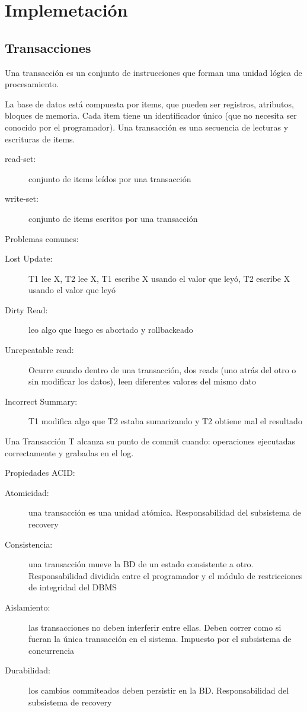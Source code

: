 \chapter{Implemetación}

\section{Transacciones}

Una transacción es un conjunto de instrucciones que forman una unidad lógica de procesamiento.

La base de datos está compuesta por items, que pueden ser registros, atributos, bloques de memoria.
Cada item tiene un identificador único (que no necesita ser conocido por el programador).
Una transacción es una secuencia de lecturas y escrituras de items.

\begin{description}
	\item[read-set:] conjunto de items leídos por una transacción
	\item[write-set:] conjunto de items escritos por una transacción
\end{description}

Problemas comunes:

\begin{description}
	\item[Lost Update:] T1 lee X, T2 lee X, T1 escribe X usando el valor que leyó, T2 escribe X usando el valor que leyó
	\item[Dirty Read:] leo algo que luego es abortado y rollbackeado
	\item[Unrepeatable read:] Ocurre cuando dentro de una transacción, dos reads (uno atrás del otro o sin modificar los datos), leen diferentes valores del mismo dato
	\item[Incorrect Summary:] T1 modifica algo que T2 estaba sumarizando y T2 obtiene mal el resultado
\end{description}

Una Transacción T alcanza su punto de commit cuando: operaciones ejecutadas correctamente y grabadas en el log.

Propiedades ACID:

\begin{description}
	\item[Atomicidad:] una transacción es una unidad atómica. Responsabilidad del subsistema de recovery
	\item[Consistencia:] una transacción mueve la BD de un estado consistente a otro. Responsabilidad dividida entre el programador y el módulo de restricciones de integridad del DBMS
	\item[Aislamiento:] las transacciones no deben interferir entre ellas. Deben correr como si fueran la única transacción en el sistema. Impuesto por el subsistema de concurrencia
	\item[Durabilidad:] los cambios commiteados deben persistir en la BD. Responsabilidad del subsistema de recovery
\end{description}

